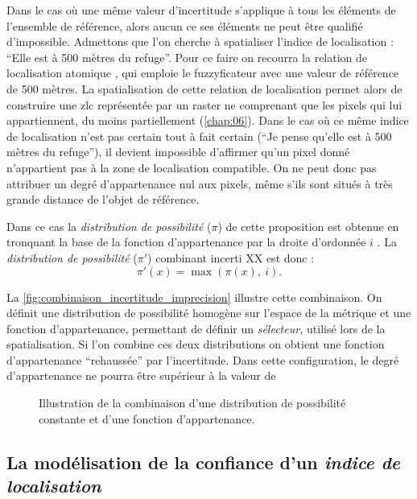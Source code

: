 Dans le cas où une même valeur d'incertitude s'applique à tous les
éléments de l'ensemble de référence, alors aucun ce ses éléments ne
peut être qualifié d'impossible.
%
Admettons que l'on cherche à spatialiser l'indice de localisation :
\enquote{Elle est à 500 mètres du refuge}. Pour ce faire on recourra
la relation de localisation atomique
, qui emploie le fuzzyficateur
 avec une valeur de référence de 500 mètres. La
spatialisation de cette relation de localisation permet alors de
construire une \ac{zlc} représentée par un raster ne comprenant que
les pixels qui lui appartiennent, du moins partiellement
(\autoref{chap:06}). Dans le cas où ce même indice de localisation
n'est pas certain tout à fait certain (\eg \enquote{Je pense qu'elle
  est à 500 mètres du refuge}), il devient impossible d'affirmer qu'un
pixel donné n'appartient pas à la zone de localisation compatible. On
ne peut donc pas attribuer un degré d'appartenance nul aux pixels,
même s'ils sont situés à très grande distance de l'objet de référence.

Dans ce cas la \emph{distribution de possibilité} (\(π\)) de cette
proposition est obtenue en tronquant la base de la fonction
d'appartenance par la droite d'ordonnée \(i\)
\autocite{Bouchon-Meunier2007}. La \emph{distribution de possibilité}
(\(π'\)) combinant incerti XX est donc :
%
\begin{equation}
  π'(x) = \max(π(x),\ i).  
\end{equation}

La \autoref{fig:combinaison_incertitude_imprecision} illustre cette
combinaison. On définit une distribution de possibilité homogène sur
l'espace de la métrique et une fonction d'appartenance, permettant de
définir un \emph{sélecteur,} utilisé lors de la spatialisation. Si
l'on combine ces deux distributions on obtient une fonction
d'appartenance \enquote{rehaussée} par l'incertitude. Dans cette
configuration, le degré d'appartenance ne pourra être supérieur à la
valeur de 

\begin{figure}
  \centering
  
  \caption{Illustration de la combinaison d'une distribution de
    possibilité constante et d'une fonction d'appartenance.}
  \label{fig:combinaison_incertitude_imprecision}
\end{figure}

\subsection{La modélisation de la confiance d'un \emph{indice de
    localisation}}

